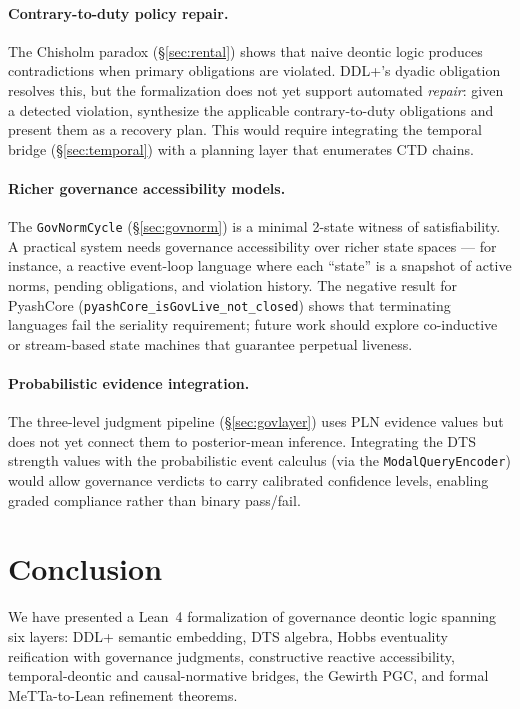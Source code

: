 \documentclass[]{article}
\newcommand{\code}[1]{\texttt{#1}}
\newcommand{\DDL}{\textup{DDL+}}
\newcommand{\DTS}{\textup{DTS}}
\newcommand{\PLN}{\textup{PLN}}
\newcommand{\PGC}{\textup{PGC}}
\begin{document}
\paragraph{Contrary-to-duty policy repair.}
The Chisholm paradox (§\ref{sec:rental}) shows that naive deontic logic
produces contradictions when primary obligations are violated.  \DDL{}'s
dyadic obligation resolves this, but the formalization does not yet support
automated \emph{repair}: given a detected violation, synthesize the
applicable contrary-to-duty obligations and present them as a recovery
plan.  This would require integrating the temporal bridge (§\ref{sec:temporal})
with a planning layer that enumerates CTD chains.

\paragraph{Richer governance accessibility models.}
The \code{GovNormCycle} (§\ref{sec:govnorm}) is a minimal 2-state
witness of satisfiability.  A practical system needs governance
accessibility over richer state spaces --- for instance, a reactive
event-loop language where each ``state'' is a snapshot of active
norms, pending obligations, and violation history.  The negative
result for PyashCore (\code{pyashCore\_isGovLive\_not\_closed}) shows
that terminating languages fail the seriality requirement; future
work should explore co-inductive or stream-based state machines
that guarantee perpetual liveness.

\paragraph{Probabilistic evidence integration.}
The three-level judgment pipeline (§\ref{sec:govlayer}) uses
\PLN{} evidence values but does not yet connect them to posterior-mean
inference.  Integrating the \DTS{} strength values with the
probabilistic event calculus (via the \code{ModalQueryEncoder}) would
allow governance verdicts to carry calibrated confidence levels,
enabling graded compliance rather than binary pass/fail.

\section{Conclusion}
\label{sec:conclusion}

We have presented a Lean~4 formalization of governance deontic logic
spanning six layers: \DDL{} semantic embedding, \DTS{} algebra, Hobbs
eventuality reification with governance judgments, constructive reactive
accessibility, temporal-deontic and causal-normative bridges, the
Gewirth \PGC{}, and formal MeTTa-to-Lean refinement theorems.
\end{document}
